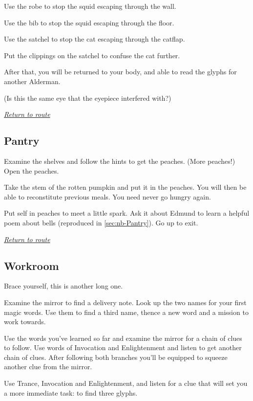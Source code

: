\documentclass[a5paper]{extarticle}
\begin{document}
Use the robe to stop the squid escaping through the wall.

Use the bib to stop the squid escaping through the floor.

Use the satchel to stop the cat escaping through the catflap.

Put the clippings on the satchel to confuse the cat further.

After that, you will be returned to your body,
and able to read the glyphs for another Alderman.

(Is this the same eye that the eyepiece interfered with?)

\hyperref[sec:route-8]{\emph{Return to route}}

\newpage
\subsection{Pantry}\label{sec:sol-Pantry}

Examine the shelves and follow the hints to get the peaches. (More peaches!)
Open the peaches.

Take the stem of the rotten pumpkin and put it in the peaches.
You will then be able to reconstitute previous meals.
You need never go hungry again.

Put self in peaches to meet a little spark.
Ask it about Edmund to learn a helpful poem about bells
(reproduced in \cref{sec:nb-Pantry}).
Go up to exit.

\hyperref[sec:route-8]{\emph{Return to route}}

\newpage
\subsection{Workroom}\label{sec:sol-Workroom}

Brace yourself, this is another long one.

Examine the mirror to find a delivery note.
Look up the two names for your first magic words.
Use them to find a third name, thence a new word and a mission to work towards.

Use the words you've learned so far and examine the mirror for a chain of clues to follow.
Use words of Invocation and Enlightenment and listen to get another chain of clues.
After following both branches you'll be equipped to squeeze another clue from the mirror.

Use Trance, Invocation and Enlightenment,
and listen for a clue that will set you a more immediate task: to find three glyphs.
\end{document}

